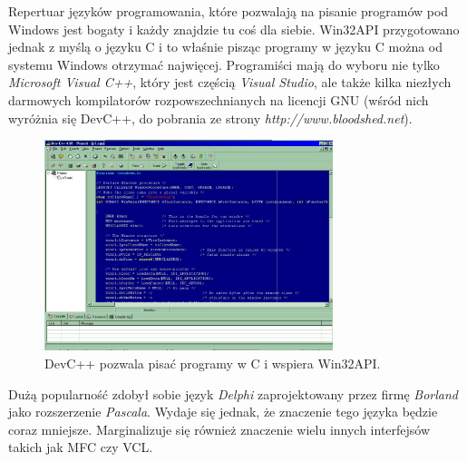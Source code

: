 Repertuar języków programowania, które pozwalają na pisanie programów pod Windows jest bogaty i każdy
znajdzie tu coś dla siebie. Win32API przygotowano jednak z myślą o języku C i to właśnie pisząc programy 
w języku C można od systemu Windows otrzymać najwięcej. Programiści mają do wyboru nie tylko 
{\em Microsoft Visual C++}, który jest częścią {\em Visual Studio}, ale także kilka niezłych darmowych
kompilatorów rozpowszechnianych na licencji GNU (wśród nich wyróżnia się DevC++, do pobrania ze strony
{\em http://www.bloodshed.net}).

\begin{figure}
\begin{center}
\includegraphics[width=0.75\textwidth]{./pic/w01}
\caption{DevC++ pozwala pisać programy w C i wspiera Win32API.}
\end{center}
\end{figure}

Dużą popularność zdobył sobie język {\em Delphi} zaprojektowany przez firmę {\em Borland} 
jako rozszerzenie {\em Pascala}. Wydaje się jednak, że znaczenie tego języka będzie coraz mniejsze.
Marginalizuje się również znaczenie wielu innych interfejsów takich jak MFC czy VCL.

